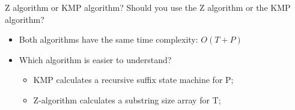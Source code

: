 \begin{frame}{Z algorithm or KMP algorithm?}
  Should you use the Z algorithm or the KMP algorithm?\bigskip

  \begin{itemize}
    \item Both algorithms have the same time complexity: $O(T+P)$\bigskip

    \item Which algorithm is easier to understand?
    \begin{itemize}
      \item KMP calculates a recursive suffix state machine for P;
      \item Z-algorithm calculates a substring size array for T;
    \end{itemize}\bigskip
  \end{itemize}
\end{frame}
